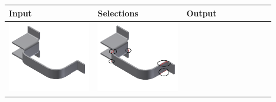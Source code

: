 \begin{minipage}[t]{0.9\linewidth}
\begin{tabular}[h]{@{} p{0.3\linewidth}| p{0.3\linewidth}|  p{0.3\linewidth}@{}} \toprule

\textbf{Input} & \textbf{Selections} & \textbf{Output} \\ \midrule


\includegraphics[width=0.98\linewidth]{..//Common/images/DefeatBracketPhase_I_3} &
\includegraphics[width=0.98\linewidth]{..//Common/images/DefeatBracketPhase_II_2_circled} &

\end{tabular}
\end{minipage}
